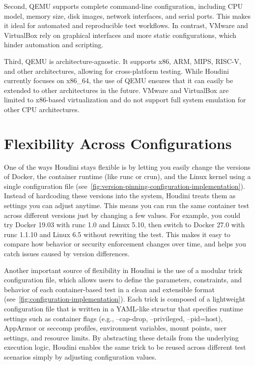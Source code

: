 \documentclass[12pt]{report}
\begin{document}
\begin{doublespace}
Second, QEMU supports complete command-line configuration, including CPU model, memory size, disk images, network interfaces, and serial ports. This makes it ideal for automated and reproducible test workflows. In contrast, VMware and VirtualBox rely on graphical interfaces and more static configurations, which hinder automation and scripting.

Third, QEMU is architecture-agnostic. It supports x86, ARM, MIPS, RISC-V, and other architectures, allowing for cross-platform testing. While Houdini currently focuses on x86\_64, the use of QEMU ensures that it can easily be extended to other architectures in the future. VMware and VirtualBox are limited to x86-based virtualization and do not support full system emulation for other CPU architectures.

\section{Flexibility Across Configurations}

One of the ways Houdini stays flexible is by letting you easily change the versions of Docker, the container runtime (like runc or crun), and the Linux kernel using a single configuration file (see~\ref{fig:version-pinning-configuration-implementation}). Instead of hardcoding these versions into the system, Houdini treats them as settings you can adjust anytime. This means you can run the same container test across different versions just by changing a few values. For example, you could try Docker 19.03 with runc 1.0 and Linux 5.10, then switch to Docker 27.0 with runc 1.1.10 and Linux 6.5 without rewriting the test. This makes it easy to compare how behavior or security enforcement changes over time, and helps you catch issues caused by version differences.

Another important source of flexibility in Houdini is the use of a modular trick configuration file, which allows users to define the parameters, constraints, and behavior of each container-based test in a clean and extensible format (see~\ref{fig:configuration-implementation}). Each trick is composed of a lightweight configuration file that is written in a YAML-like structur that specifies runtime settings such as container flags (e.g., --cap-drop, --privileged, --pid=host), AppArmor or seccomp profiles, environment variables, mount points, user settings, and resource limits. By abstracting these details from the underlying execution logic, Houdini enables the same trick to be reused across different test scenarios simply by adjusting configuration values.


\end{doublespace}
\end{document}
